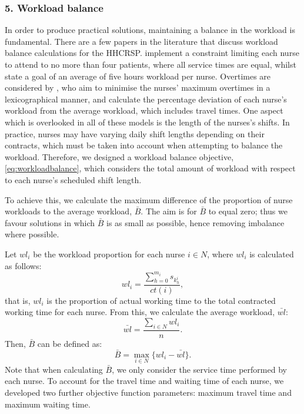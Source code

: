 \documentclass[a4paper,11pt,authoryear]{elsarticle}
\begin{document}
\subsubsection*{5. Workload balance}
\noindent In order to produce practical solutions, maintaining a balance in the workload is fundamental. There are a few papers in the literature that discuss workload balance calculations for the HHCRSP. \citet{bowers2015} implement a constraint limiting each nurse to attend to no more than four patients, where all service times are equal, whilst \citet{bredstrom2008} state a goal of an average of five hours workload per nurse. Overtimes are considered by \citet{lanzarone2014}, who aim to minimise the nurses' maximum overtimes in a lexicographical manner, and \citet{mutingi2014} calculate the percentage deviation of each nurse's workload from the average workload, which includes travel times. One aspect which is overlooked in all of these models is the length of the nurses's shifts. In practice, nurses may have varying daily shift lengths depending on their contracts, which must be taken into account when attempting to balance the workload. Therefore, we designed a workload balance objective, \eqref{eq:workloadbalance}, which considers the total amount of workload with respect to each nurse's scheduled shift length. 

To achieve this, we calculate the maximum difference of the proportion of nurse workloads to the average workload, $\bar{B}$. The aim is for $\bar{B}$ to equal zero; thus we favour solutions in which $\bar{B}$ is as small as possible, hence removing imbalance where possible.

Let $wl_i$ be the workload proportion for each nurse $i \in N$, where $wl_i$ is calculated as follows:
\begin{equation}
	wl_i = \frac{\displaystyle\sum_{h=0}^{m_i} s_{k_h^i}}{ct(i)}, \label{eq:workloadnurse}
\end{equation}
that is, $wl_i$ is the proportion of actual working time to the total contracted working time for each nurse. From this, we calculate the average workload, $\bar{wl}$:
\begin{equation}
	\bar{wl} = \frac{\displaystyle\sum_{i \in N} wl_i}{n}. \label{eq:averageworkload}
\end{equation}
Then, $\bar{B}$ can be defined as:
\begin{equation}
	\bar{B} = \max_{i \in N} \{wl_i - \bar{wl}\}. \label{eq:workloadbalance}
\end{equation}
\noindent Note that when calculating $\bar{B}$, we only consider the service time performed by each nurse. To account for the travel time and waiting time of each nurse, we developed two further objective function parameters: maximum travel time and maximum waiting time.
\end{document}
